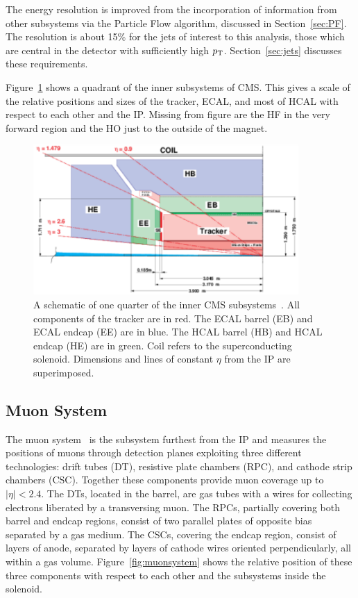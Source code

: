 The energy resolution is improved from the incorporation of information from other subsystems via
the Particle Flow algorithm, discussed in Section~\ref{sec:PF}.
The resolution is about 15\% for the jets of interest to this analysis, those which are central 
in the detector with
sufficiently high $p_{\rm T}$. Section~\ref{sec:jets} discusses these requirements.

Figure~\ref{fig:subsystems_inner} shows a quadrant of the inner subsystems of CMS. This gives
a scale of the relative positions and sizes of the tracker, ECAL,
and most of HCAL with respect to each other and the IP. Missing from figure are the HF
in the very forward region and the HO just to the outside of
the magnet.

\begin{figure}[ht]
 \begin{center}
   \includegraphics[width=0.90\textwidth]{figures/experiment/subsystems_inner.pdf}
      \end{center}
\caption{A schematic of one quarter of the inner CMS subsystems~\cite{ecaltdr}.
All components of the tracker are in red. The ECAL barrel (EB) and ECAL endcap (EE) are in blue.
The HCAL barrel (HB) and HCAL endcap (HE) are in green. Coil refers to the superconducting solenoid.
Dimensions and lines of constant $\eta$ from the IP are superimposed.}
\label{fig:subsystems_inner}
\end{figure}


\subsection{Muon System\label{subsec:muonsystem}}

The muon system~\cite{muontdr} is the subsystem furthest from the IP and measures the positions
of muons through detection planes exploiting three different technologies:
drift tubes (DT), resistive plate chambers (RPC), and cathode strip chambers (CSC).
Together these components provide muon coverage up to $|\eta|< 2.4$.
The DTs, located in the barrel, are gas tubes with a wires for collecting electrons liberated
by a transversing muon. The RPCs, partially covering both barrel and endcap regions, consist
of two parallel plates of opposite bias separated by a gas medium. The CSCs, covering the endcap region,
consist of layers of anode, separated by layers of cathode wires oriented perpendicularly, all
within a gas volume. Figure~\ref{fig:muonsystem} shows the relative position of these three components with respect to each other and the subsystems inside the solenoid.

